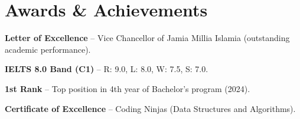 \section{Awards \& Achievements}
 \begin{itemize}[leftmargin=0.0in, label={}]
    \small{\item{

    \vspace{1pt}
    \textbf{\normalsize{}}{\normalsize \textbf{Letter of Excellence} -- Vice Chancellor of Jamia Millia Islamia (outstanding academic performance).} 
    
    \textbf{\normalsize{}}{ \normalsize \textbf{IELTS 8.0 Band (C1)} -- R: 9.0, L: 8.0, W: 7.5, S: 7.0.} 
    
     \vspace{1pt}
    \textbf{\normalsize{}}{ \normalsize \textbf{1st Rank} -- Top position in 4th year of Bachelor's program (2024).} 

    \textbf{\normalsize{}}{ \normalsize \textbf{Certificate of Excellence} -- Coding Ninjas (Data Structures and Algorithms).} 
    }}
 \end{itemize}
